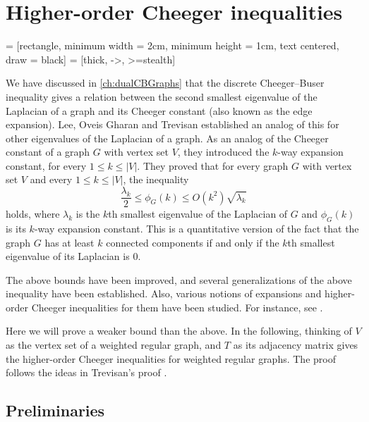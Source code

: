 \documentclass[12pt,a4paper,bold]{thesis}
\theoremstyle{definition}
\begin{document}
\chapter{Higher-order Cheeger inequalities} \label{ch:HOCI}

 = [rectangle, minimum width = 2cm, minimum height = 1cm,
text centered, draw = black]
 = [thick, ->, >=stealth]

We have discussed in \cref{ch:dualCBGraphs} that the discrete Cheeger--Buser inequality 
gives a relation between the second smallest eigenvalue of the Laplacian of a graph 
and its Cheeger constant (also known as the edge expansion).
Lee, Oveis Gharan and Trevisan \cite{Higher-Cheeger} established 
an analog of this for other eigenvalues of the Laplacian of a graph.
As an analog of the Cheeger constant of a graph $G$ with vertex set $V$, they introduced 
the $k$-way expansion constant, for every $1 \leq k \leq |V|$. They proved that
for every graph $G$ with vertex set $V$ and every $1 \leq k \leq |V|$, the inequality
\begin{equation*}
	\frac{\lambda_k}{2} \leq \phi_G(k) \leq O(k^2) \sqrt{\lambda_k}
\end{equation*}
holds, where $\lambda_k$ is the $k$th smallest eigenvalue of the Laplacian
of $G$ and $\phi_G(k)$ is its $k$-way expansion constant. This is a quantitative
version of the fact that the graph $G$ has at least $k$ connected components 
if and only if the $k$th smallest eigenvalue of its Laplacian is $0$. 

The above bounds have been improved, and several generalizations of the above inequality
have been established. Also, various notions of expansions and higher-order Cheeger 
inequalities for them have been studied. For instance, see 
\cites{Higher-Cheeger,Liu-MultiwayDualCheeger15,Atay-Liu-CheegerSigned20,HOCIBuffers24}.

Here we will prove a weaker bound than the above. In the following, thinking of $V$ 
as the vertex set of a weighted regular graph, and $T$ as its adjacency matrix 
gives the higher-order Cheeger inequalities for weighted regular graphs. 
The proof follows the ideas in Trevisan's proof \cite{Trevisan-notes-expanders}.

\section{Preliminaries}
\end{document}

